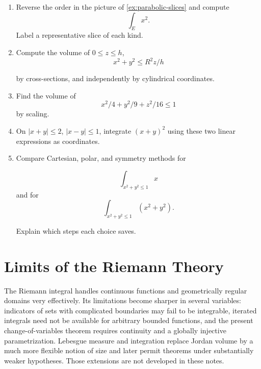 \begin{exercise}
\begin{enumerate}
\item Reverse the order in the picture of \cref{ex:parabolic-slices} and
compute
\[
\int_E x^2.
\]
 Label a representative slice of each kind.
\item Compute the volume of $0\leq z\leq h$,
\[
x^2+y^2\leq R^2z/h
\]

by cross-sections, and independently by cylindrical coordinates.
\item Find the volume of
\[
x^2/4+y^2/9+z^2/16\leq1
\]
 by scaling.
\item On $|x+y|\leq2$, $|x-y|\leq1$, integrate $(x+y)^2$ using these
two linear expressions as coordinates.
\item Compare Cartesian, polar, and symmetry methods for

\[
\int_{x^2+y^2\leq1}x
\]
 and for
\[
\int_{x^2+y^2\leq1}(x^2+y^2).
\]

Explain which steps each choice saves.
\end{enumerate}
\end{exercise}

\section{Limits of the Riemann Theory}

The Riemann integral handles continuous functions and geometrically regular
domains very effectively.  Its limitations become sharper in several
variables: indicators of sets with complicated boundaries may fail to be
integrable, iterated integrals need not be available for arbitrary bounded
functions, and the present change-of-variables theorem requires continuity
and a globally injective parametrization.  Lebesgue measure and integration
replace Jordan volume by a much more flexible notion of size and later permit
theorems under substantially weaker hypotheses.  Those extensions are not
developed in these notes.
